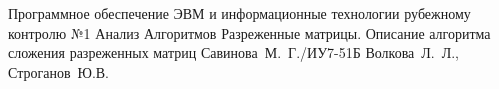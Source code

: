 \documentclass{bmstu}
\begin{document}
	
	{Программное обеспечение ЭВМ и информационные технологии}
	{рубежному контролю №1}
	{Анализ Алгоритмов}
	{Разреженные матрицы. Описание алгоритма сложения разреженных матриц}
	{}
	{Савинова~М.~Г./ИУ7-51Б}
	{Волкова~Л.~Л., Строганов~Ю.В.}
	
	\maketableofcontents
	
	
	
	
	
	
	
	
	\makebibliography
	
\end{document}
